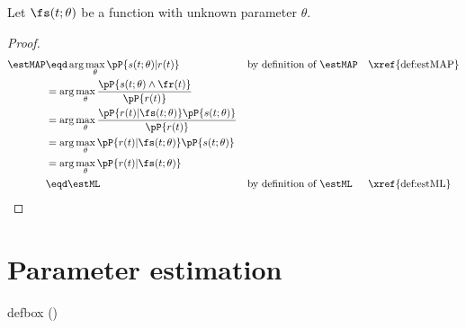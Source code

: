 \begin{theorem}
\label{thm:map=ml}
Let $\fs(t;\theta)$ be a function with unknown parameter $\theta$.
\end{theorem}
\begin{proof}
\begin{align*}
   \estMAP
     &\eqd \arg\max_{\theta} \pP{s(t;\theta)|r(t)}
     &&    \text{by definition of $\estMAP$}
     &&    \text{\xref{def:estMAP}}
   \\&=    \arg\max_{\theta} \frac{\pP{s(t;\theta) \land \fr(t)}}
                               {\pP{r(t)}}
   \\&=    \arg\max_{\theta} \frac{\pP{r(t) | \fs(t;\theta) }\pP{s(t;\theta) }}
                               {\pP{r(t)}}
   \\&=    \arg\max_{\theta} \pP{r(t) | \fs(t;\theta) }\pP{s(t;\theta) }
   \\&=    \arg\max_{\theta} \pP{r(t) | \fs(t;\theta) }
   \\&\eqd \estML
     &&  \text{by definition of $\estML$}
     &&  \text{\xref{def:estML}}
\end{align*}
\end{proof}

\section{Parameter estimation}
\begin{definition}
\label{def:mse}
defbox{
  \mse(\est) \eqd \pE{}
  }
\end{definition}

